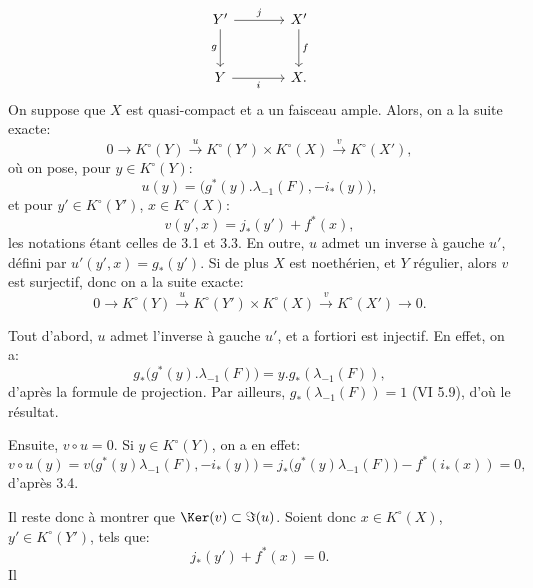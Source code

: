 \[
\begin{tikzcd}[column sep=large,row sep=large]
Y' \arrow[r,"j"] \arrow[d,"g"'] & X' \arrow[d,"f"]\\
Y \arrow[r,"i"'] & X.
\end{tikzcd}
\]
On
suppose que \(X\) est quasi-compact et a un faisceau ample. Alors, on a la suite exacte:
\[
0\longrightarrow K^\circ(Y)\xrightarrow{u}K^\circ(Y')\times K^\circ(X)
\xrightarrow{v}K^\circ(X'),
\]
où on pose, pour \(y\in K^\circ(Y)\):
\[
u(y)=\bigl(g^*(y).\lambda_{-1}(F),-i_*(y)\bigr),
\]
et pour \(y'\in K^\circ(Y')\), \(x\in K^\circ(X)\):
\[
v(y',x)=j_*(y')+f^*(x),
\]
les notations étant celles de 3.1 et 3.3. En outre, \(u\) admet un inverse à gauche \(u'\), défini par \(u'(y',x)=g_*(y')\).
Si de plus \(X\) est noethérien, et \(Y\) régulier, alors \(v\) est surjectif, donc on a la suite exacte:
\[
0\longrightarrow K^\circ(Y)\xrightarrow{u}K^\circ(Y')\times K^\circ(X)
\xrightarrow{v}K^\circ(X')\longrightarrow0.
\]

Tout d'abord, \(u\) admet l'inverse à gauche \(u'\), et a fortiori est injectif. En effet, on a:
\[
g_*\bigl(g^*(y).\lambda_{-1}(F)\bigr)
=y.g_*(\lambda_{-1}(F)),
\]
d'après la formule de projection. Par ailleurs, \(g_*(\lambda_{-1}(F))=1\) (VI 5.9), d'où le résultat.

Ensuite, \(v\circ u=0\). Si \(y\in K^\circ(Y)\), on a en effet:
\[
v\circ u(y)
=v\bigl(g^*(y)\lambda_{-1}(F),-i_*(y)\bigr)
=j_*\bigl(g^*(y)\lambda_{-1}(F)\bigr)-f^*(i_*(x))=0,
\]
d'après 3.4.

Il reste donc à montrer que \(\Ker(v)\subset \Im(u)\). Soient donc \(x\in K^\circ(X)\), \(y'\in K^\circ(Y')\), tels que:
\[
j_*(y')+f^*(x)=0.
\]
Il
